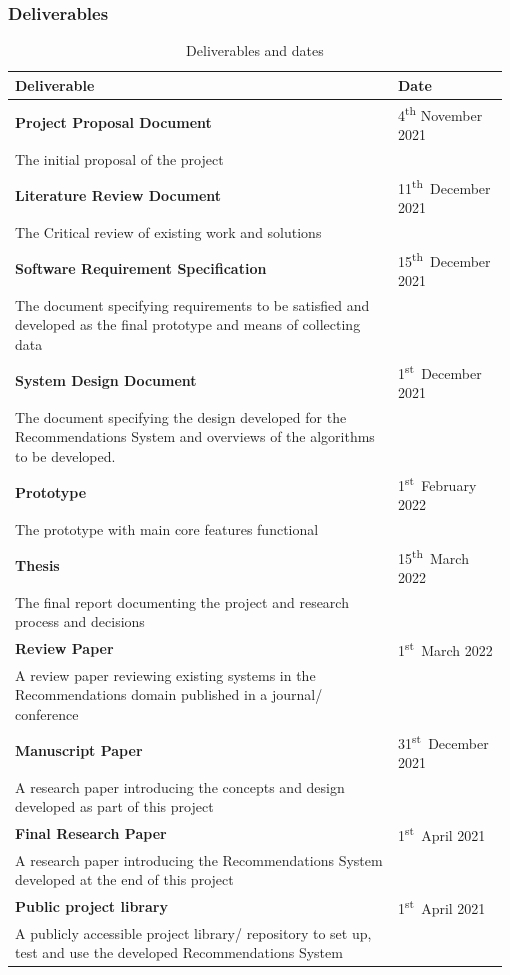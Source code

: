 \documentclass[a4paper, 12pt, oneside]{report}
\begin{document}
\newpage
\subsubsection{Deliverables}

\begin{longtable}{| p{0.76\linewidth} | p{0.22\linewidth}|}
\caption{Deliverables and dates}
\label{tab:deliverables-table}\\
\hline
Deliverable &   Date  \\ 
\hline
\textbf{Project Proposal Document}    &   4\textsuperscript{th} November 2021\\
The initial proposal of the project  &  \\ 
\hline
\textbf{Literature Review Document} & 11\textsuperscript{th}~December 2021  \\ 
The Critical review of existing work and solutions  & \\ 
\hline
\textbf{Software Requirement Specification} & 15\textsuperscript{th}~December 2021 \\ 
The document specifying requirements to be satisfied and developed as the final prototype and means of collecting data &    \\ 
\hline
\textbf{System Design Document} & 1\textsuperscript{st}~December 2021  \\ 
The document specifying the design developed for the Recommendations System and overviews of the algorithms to be developed.    &   \\ 
\hline
\textbf{Prototype}  & 1\textsuperscript{st}~February 2022   \\
The prototype with main core features functional    &    \\ \hline
\textbf{Thesis} & 15\textsuperscript{th}~March 2022  \\  The final report documenting the project and research process and decisions          &   \\ 
\hline
\textbf{Review Paper}  &  1\textsuperscript{st}~March 2022     \\ 
A review paper reviewing existing systems in the Recommendations domain published in a journal/ conference    &   \\ 
\hline
\textbf{Manuscript Paper}   &  31\textsuperscript{st}~December 2021 \\ 
A research paper introducing the concepts and design developed as part of this project &   \\ 
\hline
\textbf{Final Research Paper}   &   1\textsuperscript{st}~April 2021    \\ 
A research paper introducing the Recommendations System developed at the end of this project    &    \\ 
\hline
\textbf{Public project library}   &   1\textsuperscript{st}~April 2021 \\ 
A publicly accessible project library/ repository to set up, test and use the developed Recommendations System  &   \\
\hline
\end{longtable}
\end{document}
